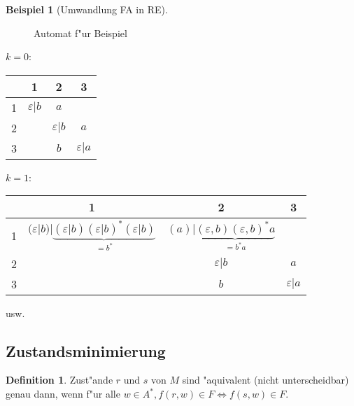 \documentclass[german, 10pt, a4paper, twocolumn]{scrartcl}
\theoremstyle{definition}
\newtheorem*{definition}{Definition}
\theoremstyle{example}
\newtheorem{example}{Beispiel}[subsection]
\begin{document}
\begin{example}[Umwandlung FA in RE]
\
\begin{figure}[htb]
\begin{center}
\MediumPicture
{}
\end{center}
\caption{Automat f"ur Beispiel}
\end{figure}

$k=0$:
\begin{center}
\small
\begin{tabular}{c||c|c|c}
	&	1 &			2 &			3\\ \hline \hline
	1 &	$\varepsilon | b$ &	$a$ &			\\ \hline
	2 &	 &			$\varepsilon | b$ &	$a$\\ \hline
	3 &	 &			$b$ &			$\varepsilon | a$
\end{tabular}
\normalsize
\end{center}

$k=1$:
\begin{center}
\small
\begin{tabular}{c||c|c|c}
	&	1 &			2 &			3\\ \hline \hline
	1 &	$(\varepsilon | b) | \underbrace{(\varepsilon | b)(\varepsilon | b)^* (\varepsilon | b)}_{= b^*}$ &	$(a)|\underbrace{(\varepsilon, b)(\varepsilon, b)^* a}_{= b^* a}$ &			\\ \hline
	2 &	 &			$\varepsilon | b$ &	$a$\\ \hline
	3 &	 &			$b$ &			$\varepsilon | a$
\end{tabular}
\normalsize
\end{center}

usw.

\end{example}

\subsection{Zustandsminimierung}

\begin{definition}
	Zust"ande $r$ und $s$ von $M$ sind "aquivalent (nicht unterscheidbar) genau dann, wenn f"ur alle $w \in  A^*, f(r,w)\in F \Leftrightarrow f(s,w)\in F$.
\end{definition}
\end{document}
